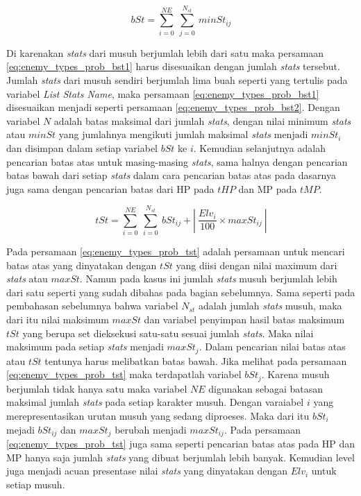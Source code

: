 \begin{equation}\label{eq:enemy_types_prob_bst2}
bSt = \sum_{i=0}^{NE}\ \sum_{j=0}^{N_{st}}\ minSt_{ij}
\end{equation}

Di karenakan \textit{stats} dari musuh berjumlah lebih dari satu maka persamaan \ref{eq:enemy_types_prob_bst1} harus disesuaikan dengan jumlah \textit{stats} tersebut. Jumlah \textit{stats} dari musuh sendiri berjumlah lima buah seperti yang tertulis pada variabel \textit{List Stats Name}, maka persamaan \ref{eq:enemy_types_prob_bst1} disesuaikan menjadi seperti persamaan \ref{eq:enemy_types_prob_bst2}. Dengan variabel $N$ adalah batas maksimal dari jumlah \textit{stats}, dengan nilai minimum \textit{stats} atau $minSt$ yang jumlahnya mengikuti jumlah maksimal \textit{stats} menjadi $minSt_{i}$ dan disimpan dalam setiap variabel $bSt$ ke $i$. Kemudian selanjutnya adalah pencarian batas atas untuk masing-masing \textit{stats}, sama halnya dengan pencarian batas bawah dari setiap \textit{stats} dalam cara pencarian batas atas pada dasarnya juga sama dengan pencarian batas dari HP pada $tHP$ dan MP pada $tMP$.
\vspace{1ex}

\begin{equation}\label{eq:enemy_types_prob_tst}
tSt = \sum_{i=0}^{NE}\ \sum_{i=0}^{N_{st}}\ bSt_{ij} + \left |\ \frac{Elv_{i}}{100} \times maxSt_{ij}\ \right |
\end{equation}

Pada persamaan \ref{eq:enemy_types_prob_tst} adalah persamaan untuk mencari batas atas yang dinyatakan dengan $tSt$ yang diisi dengan nilai maximum dari \textit{stats} atau $maxSt$. Namun pada kasus ini jumlah \textit{stats} musuh berjumlah lebih dari satu seperti yang sudah dibahas pada bagian sebelumnya. Sama seperti pada pembahasan sebelumnya bahwa variabel $N_{st}$ adalah jumlah \textit{stats} musuh, maka dari itu nilai maksimum $maxSt$ dan variabel penyimpan hasil batas maksimum $tSt$ yang berupa set dieksekusi satu-satu sesuai jumlah \textit{stats}. Maka nilai maksimum pada setiap \textit{stats} menjadi $maxSt_{j}$. Dalam pencarian nilai batas atas atau $tSt$ tentunya harus melibatkan batas bawah. Jika melihat pada persamaan \ref{eq:enemy_types_prob_tst} maka terdapatlah variabel $bSt_{j}$. Karena musuh berjumlah tidak hanya satu maka variabel $NE$ digunakan sebagai batasan maksimal jumlah \textit{stats} pada setiap karakter musuh. Dengan varaiabel $i$ yang merepresentasikan urutan musuh yang sedang diproeses. Maka dari itu $bSt_{i}$ mejadi $bSt_{ij}$ dan $maxSt_{j}$ berubah menjadi $maxSt_{ij}$. Pada persamaan \ref{eq:enemy_types_prob_tst} juga sama seperti pencarian batas atas pada HP dan MP hanya saja jumlah \textit{stats} yang dibuat berjumlah lebih banyak. Kemudian level juga menjadi acuan presentase nilai \textit{stats} yang dinyatakan dengan $Elv_{i}$ untuk setiap musuh.

